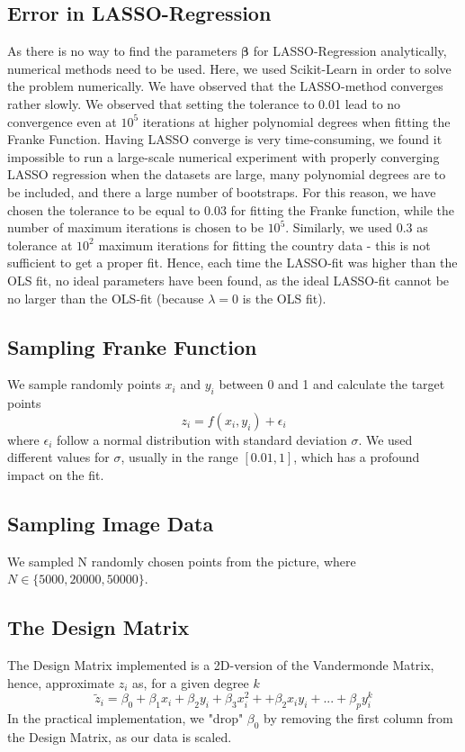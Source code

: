 \documentclass[11pt,a4paper,titlepage]{article}
\begin{document}
\subsection{Error in LASSO-Regression}
As there is no way to find the parameters $\bm{\beta}$ for LASSO-Regression analytically, numerical methods need to be used. Here, we used Scikit-Learn in order to solve the problem numerically. We have observed that the LASSO-method converges rather slowly. We observed that setting the tolerance to 0.01 lead to no convergence even at $10^5$ iterations at higher polynomial degrees when fitting the Franke Function. Having LASSO converge is very time-consuming, we found it impossible to run a large-scale numerical experiment with properly converging LASSO regression when the datasets are large, many polynomial degrees are to be included, and there a large number of bootstraps. For this reason, we have chosen the tolerance to be equal to 0.03 for fitting the Franke function, while the number of maximum iterations is chosen to be $10^5$.  Similarly, we used 0.3 as tolerance at $10^2$ maximum iterations for fitting the country data - this is not sufficient to get a proper fit.  Hence, each time the LASSO-fit was higher than the OLS fit, no ideal parameters have been found, as the ideal LASSO-fit cannot be no larger than the OLS-fit (because $\lambda=0$ is the OLS fit).
\subsection{Sampling Franke Function}
We sample randomly points $x_i$ and $y_i$ between 0 and 1 and calculate the target points
\begin{equation*}
z_i=f(x_i,y_i)+\epsilon_i
\end{equation*}
where $\epsilon_i$ follow a normal distribution with standard deviation $\sigma$. We used different values for $\sigma$, usually in the range $[0.01,1]$, which has a profound impact on the fit. 
\subsection{Sampling Image Data}
We sampled N randomly chosen points from the picture, where $N \in \{5000, 20000, 50000 \}$.
\subsection{The Design Matrix}
The Design Matrix implemented is a 2D-version of the Vandermonde Matrix, hence, approximate $z_i$ as, for a given degree $k$
\begin{equation*}
\tilde z_i=\beta_0+\beta_1x_i+\beta_2y_i+\beta_3x_i^2++\beta_2x_iy_i+...+\beta_py_i^k
\end{equation*}
In the practical implementation, we "drop" $\beta_0$ by removing the first column from the Design Matrix, as our data is scaled.
\end{document}
